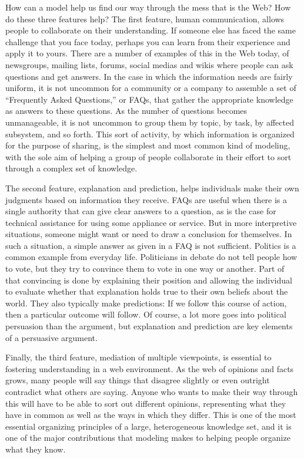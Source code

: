 How can a model help us find our way through the mess that is the Web?
How do these three features help? The first feature, human
communication, allows people to collaborate on their understanding. If
someone else has faced the same challenge that you face today, perhaps
you can learn from their experience and apply it to yours. There are a
number of examples of this in the Web today, of newsgroups, mailing
lists, forums, social medias and wikis where people can ask questions
and get answers. In the case in which the information needs are fairly
uniform, it is not uncommon for a community or a company to assemble a
set of ``Frequently Asked Questions,'' or FAQs, that gather the
appropriate knowledge as answers to these questions. As the number of
questions becomes unmanageable, it is not uncommon to group them by
topic, by task, by affected subsystem, and so forth. This sort of
activity, by which information is organized for the purpose of sharing,
is the simplest and most common kind of modeling, with the sole aim of
helping a group of people collaborate in their effort to sort through a
complex set of knowledge.

The second feature, explanation and prediction, helps individuals make
their own judgments based on information they receive. FAQs are useful
when there is a single authority that can give clear answers to a
question, as is the case for technical assistance for using some
appliance or service. But in more interpretive situations, someone might
want or need to draw a conclusion for themselves. In such a situation, a
simple answer as given in a FAQ is not sufficient. Politics is a common
example from everyday life. Politicians in debate do not tell people how
to vote, but they try to convince them to vote in one way or another.
Part of that convincing is done by explaining their position and
allowing the individual to evaluate whether that explanation holds true
to their own beliefs about the world. They also typically make
predictions: If we follow this course of action, then a particular
outcome will follow. Of course, a lot more goes into political
persuasion than the argument, but explanation and prediction are key
elements of a persuasive argument.

Finally, the third feature, mediation of multiple viewpoints, is
essential to fostering understanding in a web environment. As the web of
opinions and facts grows, many people will say things that disagree
slightly or even outright contradict what others are saying. Anyone who
wants to make their way through this will have to be able to sort out
different opinions, representing what they have in common as well as the
ways in which they differ. This is one of the most essential organizing
principles of a large, heterogeneous knowledge set, and it is one of the
major contributions that modeling makes to helping people organize what
they know.

